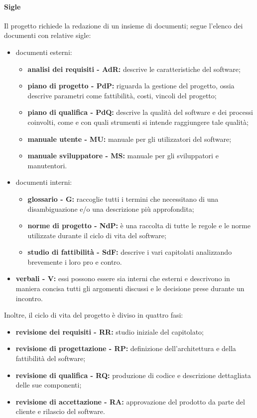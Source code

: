			\paragraph{Sigle}
				Il progetto richiede la redazione di un insieme di documenti; segue l'elenco dei documenti con relative sigle:
				\begin{itemize}
					\item documenti esterni:
						\begin{itemize}
							\item \textbf{analisi dei requisiti - AdR:} descrive le caratteristiche del software;
							\item \textbf{piano di progetto - PdP:} riguarda la gestione del progetto, ossia descrive parametri come fattibilità, costi, vincoli del progetto;
							\item \textbf{piano di qualifica - PdQ:} descrive la qualità del software e dei processi coinvolti, come e con quali strumenti si intende raggiungere tale qualità;
							\item \textbf{manuale utente - MU:} manuale per gli utilizzatori del software;
							\item \textbf{manuale sviluppatore - MS:} manuale per gli sviluppatori e manutentori.
						\end{itemize}
					\item documenti interni:
						\begin{itemize}
							\item \textbf{glossario - G:} raccoglie tutti i termini che necessitano di una disambiguazione e/o una descrizione più approfondita;
							\item \textbf{norme di progetto - NdP:} è una raccolta di tutte le regole e le norme utilizzate durante il ciclo di vita del software;
							\item \textbf{studio di fattibilità - SdF:} descrive i vari capitolati analizzando brevemente i loro pro e contro.
						\end{itemize}
					\item \textbf{verbali - V:} essi possono essere sia interni che esterni e descrivono in maniera concisa tutti gli argomenti discussi e le decisione prese durante un incontro.
				\end{itemize}
				Inoltre, il ciclo di vita del progetto è diviso in quattro fasi:
				\begin{itemize}
					\item \textbf{revisione dei requisiti - RR:} studio iniziale del capitolato;
					\item \textbf{revisione di progettazione - RP:} definizione dell'architettura e della fattibilità del software;
					\item \textbf{revisione di qualifica - RQ:} produzione di codice e descrizione dettagliata delle sue componenti;
					\item \textbf{revisione di accettazione - RA:} approvazione del prodotto da parte del cliente e rilascio del software.
				\end{itemize}
